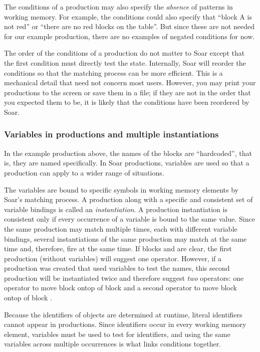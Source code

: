 The conditions of a production may also specify the \emph{absence} of patterns
in working memory. For example, the conditions could also specify that ``block
A is not red'' or ``there are no red blocks on the table''. But since these are
not needed for our example production, there are no examples of negated
conditions for now.

The order of the conditions of a production do not matter to Soar except
that the first condition must directly test the state. Internally, Soar
will reorder the conditions so that the matching process can be more
efficient. This is a mechanical detail that need not concern most
users. However, you may print your productions to the screen or save
them in a file; if they are not in the order that you expected them to
be, it is likely that the conditions have been reordered by Soar.

\subsubsection{Variables in productions and multiple instantiations}

In the example production above, the names of the blocks are ``hardcoded'',
that is, they are named specifically. In Soar productions, variables are used
so that a production can apply to a wider range of situations.

The variables are bound to specific symbols in working memory elements
by Soar's matching process.  A production along with a specific and
consistent set of variable bindings is called an \emph{instantiation}. A
production instantiation is consistent only if every occurrence of a
variable is bound to the same value.  Since the same production may
match multiple times, each with different variable bindings, several
instantiations of the same production may match at the same time and,
therefore, fire at the same time.  If blocks  and  are
clear, the first production (without variables) will suggest one
operator. However, if a production was created that used variables to
test the names, this second production will be instantiated twice and
therefore suggest \textit{two} operators: one operator to move block
 ontop of block  and a second operator to move block
 ontop of block .

Because the identifiers of objects are determined at runtime, literal
identifiers cannot appear in productions. Since identifiers occur in
every working memory element, variables must be used to test for
identifiers, and using the same variables across multiple occurrences is what links conditions together.

